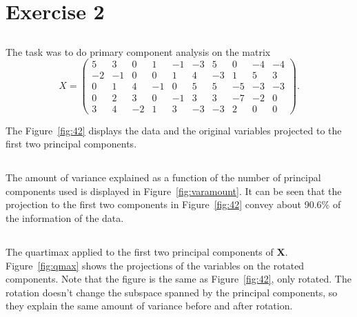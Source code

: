 \documentclass{article}
\begin{document}
\clearpage
\section{Exercise 2}
\newcommand{\X}{\ensuremath{\mathbf{X}}}
\subsection{}
The task was to do primary component analysis on the matrix
$$ X =
\begin{pmatrix}
	5 & 3 & 0 & 1 & -1 & -3 & 5 & 0 & -4 & -4 \\
	-2 & -1 & 0 & 0 & 1 & 4 & -3 & 1 & 5 & 3 \\
	0 & 1 & 4 & -1 & 0 & 5 & 5 & -5 & -3 & -3 \\
	0 & 2 & 3 & 0 & -1 & 3 & 3 & -7 & -2 & 0 \\
	3 & 4 & -2 & 1 & 3 & -3 & -3 & 2 & 0 & 0
\end{pmatrix}.
$$

The Figure~\ref{fig:42} displays the data and the original variables projected to the first two principal components.
\subsection{}
The amount of variance explained as a function of the number of principal components used is displayed in Figure~\ref{fig:varamount}. It can be seen that the projection to the first two components in Figure~\ref{fig:42} convey about 90.6\% of the information of the data.
\subsection{}
\subsection{}
The quartimax applied to the first two principal components of \X. Figure~\ref{fig:qmax} shows the projections of the variables on the rotated components. Note that the figure is the same as Figure~\ref{fig:42}, only rotated. The rotation doesn't change the subspace spanned by the principal components, so they explain the same amount of variance before and after rotation.
\end{document}
